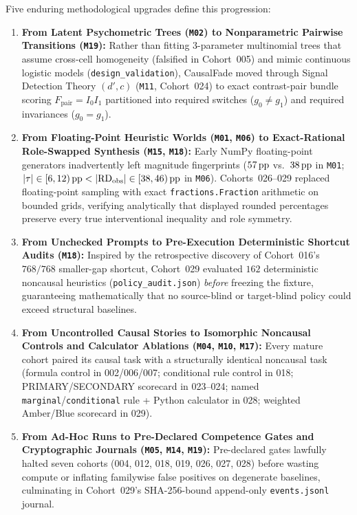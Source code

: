 Five enduring methodological upgrades define this progression:
\begin{enumerate}
  \item \textbf{From Latent Psychometric Trees (\texttt{M02}) to Nonparametric Pairwise Transitions (\texttt{M19}):} Rather than fitting 3-parameter multinomial trees that assume cross-cell homogeneity (falsified in Cohort~005) and mimic continuous logistic models (\texttt{design\_validation}), CausalFade moved through Signal Detection Theory $(d', c)$ (\texttt{M11}, Cohort~024) to exact contrast-pair bundle scoring $F_{\mathrm{pair}} = I_0 I_1$ partitioned into required switches ($g_0 \neq g_1$) and required invariances ($g_0 = g_1$).
  \item \textbf{From Floating-Point Heuristic Worlds (\texttt{M01}, \texttt{M06}) to Exact-Rational Role-Swapped Synthesis (\texttt{M15}, \texttt{M18}):} Early NumPy floating-point generators inadvertently left magnitude fingerprints ($57\,\mathrm{pp}$ vs.\ $38\,\mathrm{pp}$ in \texttt{M01}; $|\tau| \in [6,12)\,\mathrm{pp} < |\mathrm{RD}_{\mathrm{obs}}| \in [38,46)\,\mathrm{pp}$ in \texttt{M06}). Cohorts~026--029 replaced floating-point sampling with exact \texttt{fractions.Fraction} arithmetic on bounded grids, verifying analytically that displayed rounded percentages preserve every true interventional inequality and role symmetry.
  \item \textbf{From Unchecked Prompts to Pre-Execution Deterministic Shortcut Audits (\texttt{M18}):} Inspired by the retrospective discovery of Cohort~016's $768/768$ smaller-gap shortcut, Cohort~029 evaluated $162$ deterministic noncausal heuristics (\texttt{policy\_audit.json}) \emph{before} freezing the fixture, guaranteeing mathematically that no source-blind or target-blind policy could exceed structural baselines.
  \item \textbf{From Uncontrolled Causal Stories to Isomorphic Noncausal Controls and Calculator Ablations (\texttt{M04}, \texttt{M10}, \texttt{M17}):} Every mature cohort paired its causal task with a structurally identical noncausal task (formula control in 002/006/007; conditional rule control in 018; PRIMARY/SECONDARY scorecard in 023--024; named \texttt{marginal}/\texttt{conditional} rule + Python calculator in 028; weighted Amber/Blue scorecard in 029).
  \item \textbf{From Ad-Hoc Runs to Pre-Declared Competence Gates and Cryptographic Journals (\texttt{M05}, \texttt{M14}, \texttt{M19}):} Pre-declared gates lawfully halted seven cohorts (004, 012, 018, 019, 026, 027, 028) before wasting compute or inflating familywise false positives on degenerate baselines, culminating in Cohort~029's SHA-256-bound append-only \texttt{events.jsonl} journal.
\end{enumerate}

